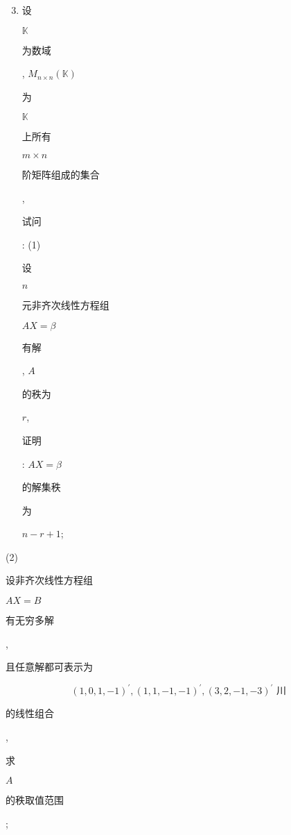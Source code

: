 \documentclass[10pt]{article}
\begin{document}
\begin{enumerate}
  \setcounter{enumi}{2}
  \item \begin{CJK}{UTF8}{mj}设\end{CJK} $\mathbb{K}$ \begin{CJK}{UTF8}{mj}为数域\end{CJK}, $M_{n \times n}(\mathbb{K})$ \begin{CJK}{UTF8}{mj}为\end{CJK} $\mathbb{K}$ \begin{CJK}{UTF8}{mj}上所有\end{CJK} $m \times n$ \begin{CJK}{UTF8}{mj}阶矩阵组成的集合\end{CJK}, \begin{CJK}{UTF8}{mj}试问\end{CJK}: (1) \begin{CJK}{UTF8}{mj}设\end{CJK} $n$ \begin{CJK}{UTF8}{mj}元非齐次线性方程组\end{CJK} $A X=\beta$ \begin{CJK}{UTF8}{mj}有解\end{CJK}, $A$ \begin{CJK}{UTF8}{mj}的秩为\end{CJK} $r$, \begin{CJK}{UTF8}{mj}证明\end{CJK}: $A X=\beta$ \begin{CJK}{UTF8}{mj}的解集秩\end{CJK} \begin{CJK}{UTF8}{mj}为\end{CJK} $n-r+1$;
\end{enumerate}
(2) \begin{CJK}{UTF8}{mj}设非齐次线性方程组\end{CJK} $A X=B$ \begin{CJK}{UTF8}{mj}有无穷多解\end{CJK}, \begin{CJK}{UTF8}{mj}且任意解都可表示为\end{CJK}
$$
(1,0,1,-1)^{\prime},(1,1,-1,-1)^{\prime},(3,2,-1,-3)^{\prime} \text { 川 }
$$
\begin{CJK}{UTF8}{mj}的线性组合\end{CJK}, \begin{CJK}{UTF8}{mj}求\end{CJK} $A$ \begin{CJK}{UTF8}{mj}的秩取值范围\end{CJK};
\end{document}
